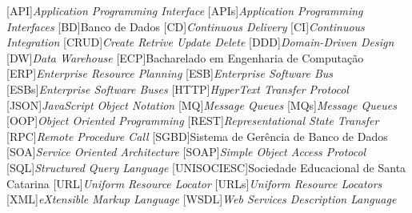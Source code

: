
[API]{\emph{Application Programming Interface}}
[APIs]{\emph{Application Programming Interfaces}}
[BD]{Banco de Dados}
[CD]{\emph{Continuous Delivery}}
[CI]{\emph{Continuous Integration}}
[CRUD]{\emph{Create Retrive Update Delete}}
[DDD]{\emph{Domain-Driven Design}}
[DW]{\emph{Data Warehouse}}
[ECP]{Bacharelado em Engenharia de Computação}
[ERP]{\emph{Enterprise Resource Planning}}
[ESB]{\emph{Enterprise Software Bus}}
[ESBs]{\emph{Enterprise Software Buses}}
[HTTP]{\emph{HyperText Transfer Protocol}}
[JSON]{\emph{JavaScript Object Notation}}
[MQ]{\emph{Message Queues}}
[MQs]{\emph{Message Queues}}
[OOP]{\emph{Object Oriented Programming}}
[REST]{\emph{Representational State Transfer}}
[RPC]{\emph{Remote Procedure Call}}
[SGBD]{Sistema de Gerência de Banco de Dados}
[SOA]{\emph{Service Oriented Architecture}}
[SOAP]{\emph{Simple Object Access Protocol}}
[SQL]{\emph{Structured Query Language}}
[UNISOCIESC]{Sociedade Educacional de Santa Catarina}
[URL]{\emph{Uniform Resource Locator}}
[URLs]{\emph{Uniform Resource Locators}}
[XML]{\emph{eXtensible Markup Language}}
[WSDL]{\emph{Web Services Description Language}}
